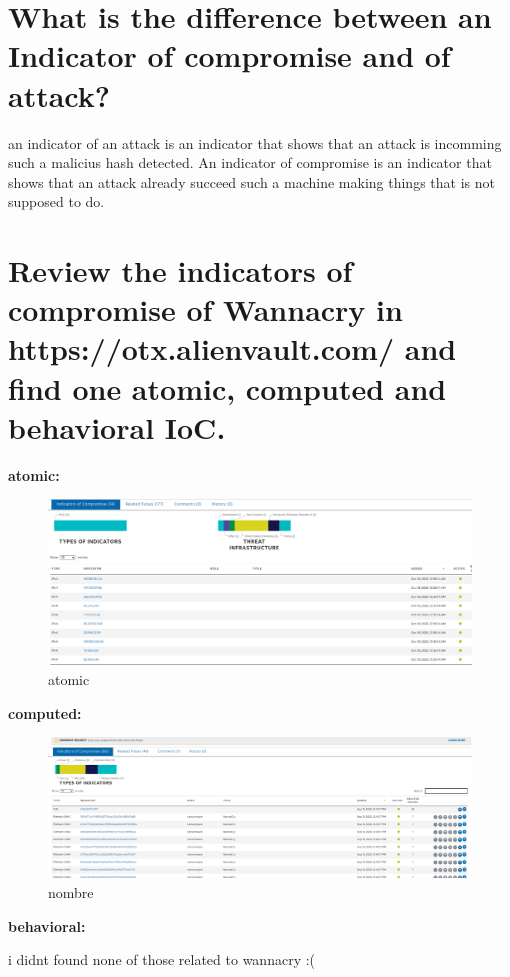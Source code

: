 \documentclass[10pt,a4paper]{article} %
\begin{document}
    \section{What is the difference between an Indicator of compromise and of attack?}

        an indicator of an attack is an indicator that shows that an attack is
        incomming such a malicius hash detected. An indicator of compromise is
        an indicator that shows that an attack already succeed such a machine
        making things that is not supposed to do.

    \newpage
    \section{Review the indicators of compromise of Wannacry in
    https://otx.alienvault.com/ and find one atomic, computed and behavioral
    IoC.}
    \textbf{atomic:}
    \begin{figure}[h!]
        \centering
        \includegraphics[width=1.0\linewidth]{bla.png}
        \caption{atomic}
        \label{atom}
    \end{figure}
    \textbf{computed:}

    \begin{figure}[h!]
        \centering
        \includegraphics[width=1.0\linewidth]{bla2.png}
        \caption{nombre}
        \label{fig}
    \end{figure}


    \textbf{behavioral:}
    \begin{center}
        i didnt found none of those related to wannacry :(
    \end{center}
























    \nocite{*}
    
    
\end{document}
